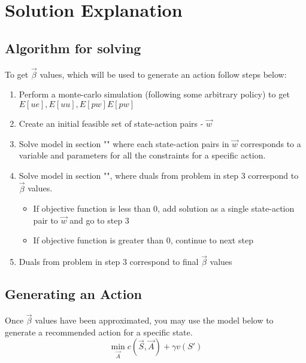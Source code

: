 \documentclass{article}
\begin{document}
\section{Solution Explanation}
\subsection{Algorithm for solving}
To get $\vec{\beta}$ values, which will be used to generate an action follow steps below:
\begin{enumerate}
	\item Perform a monte-carlo simulation (following some arbitrary policy) to get $E[ue], E[uu], E[pw] E[pw]$
	\item Create an initial feasible set of state-action pairs - $\vec{w}$
	\item Solve model in section "" where each state-action pairs in $\vec{w}$ corresponds to a variable and parameters for all the constraints for a specific action.
	\item Solve model in section "", where duals from problem in step 3  correspond to $\vec{\beta}$ values. 
		\begin{itemize}
			\item If objective function is less than 0, add solution as a single state-action pair to $\vec{w}$ and go to step 3
			\item If objective function is greater than 0, continue to next step
		\end{itemize}
	\item Duals from problem in step 3 correspond to final $\vec{\beta}$ values
\end{enumerate}
	
\subsection{Generating an Action}
Once $\vec{\beta}$ values have been approximated, you may use the model below to generate a recommended action for a specific state.
\begin{equation*}
	\min_{\vec{A}} c(\vec{S}, \vec{A}) + \gamma v(S')
\end{equation*}	
\end{document}
